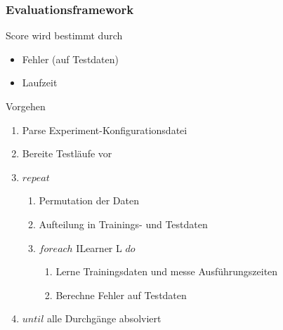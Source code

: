 \documentclass[18pt]{beamer}
\begin{document}
	\begin{frame}[allowframebreaks]\frametitle{Evaluationsframework}
		\begin{block}{Score}
			wird bestimmt durch
		    \begin{itemize}
		    	\item Fehler (auf Testdaten)
		    	\item Laufzeit
		    \end{itemize}
		\end{block}
	\framebreak
		\begin{block}{Vorgehen}
		    \begin{enumerate}
				\item Parse Experiment-Konfigurationsdatei
				\item Bereite Testläufe vor
				\item $repeat$
				\begin{enumerate}
					\item Permutation der Daten				
					\item Aufteilung in Trainings- und Testdaten
					\item $foreach$ ILearner L $do$
					\begin{enumerate}
						\item Lerne Trainingsdaten und messe Ausführungszeiten
						\item Berechne Fehler auf Testdaten
					\end{enumerate}
				\end{enumerate}
				\item $until$ alle Durchgänge absolviert
		    \end{enumerate}
		\end{block}
		
	\framebreak
		

\end{frame}
\end{document}
